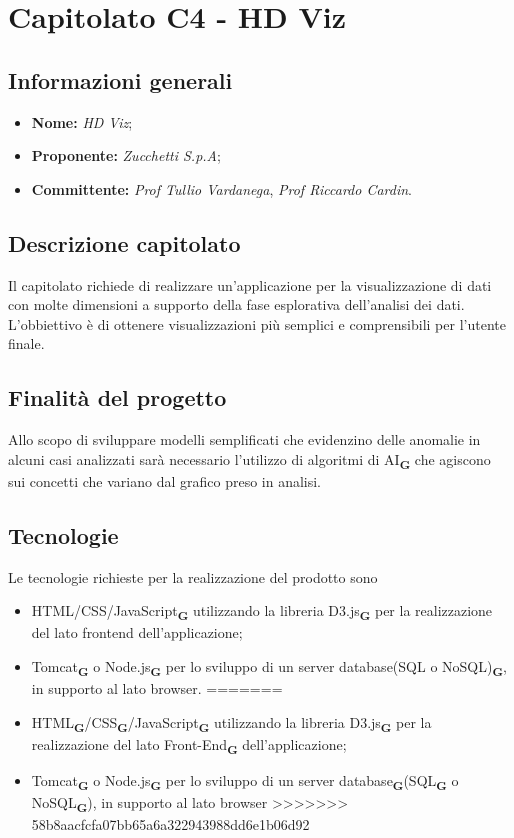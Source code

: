 \section{Capitolato C4 - HD Viz}

\subsection{Informazioni generali}

\begin{itemize}
    \item \textbf{Nome:} \textit{HD Viz};
    \item \textbf{Proponente:} \textit{Zucchetti S.p.A};
    \item \textbf{Committente:} \emph{Prof Tullio Vardanega}, \emph{Prof Riccardo Cardin}.
\end{itemize}

\subsection{Descrizione capitolato}
Il capitolato richiede di realizzare un'applicazione per la
visualizzazione di dati con molte dimensioni a supporto della fase esplorativa
dell'analisi dei dati. L'obbiettivo è di ottenere visualizzazioni più semplici e comprensibili per l'utente finale.

\subsection{Finalità del progetto}
Allo scopo di sviluppare modelli semplificati che evidenzino delle anomalie in alcuni casi analizzati sarà necessario l'utilizzo di algoritmi di AI\textsubscript{\textbf{G}} che agiscono sui concetti che variano dal grafico preso in analisi.

\subsection{Tecnologie}
Le tecnologie richieste per la realizzazione del prodotto sono
\begin{itemize}
<<<<<<< HEAD
    \item HTML/CSS/JavaScript\textsubscript{\textbf{G}} utilizzando la libreria D3.js\textsubscript{\textbf{G}} per la realizzazione del lato frontend dell'applicazione;
    \item Tomcat\textsubscript{\textbf{G}} o Node.js\textsubscript{\textbf{G}} per lo sviluppo di un server database(SQL o NoSQL)\textsubscript{\textbf{G}}, in supporto al lato browser.
=======
\item HTML\textsubscript{\textbf{G}}/CSS\textsubscript{\textbf{G}}/JavaScript\textsubscript{\textbf{G}} utilizzando la libreria D3.js\textsubscript{\textbf{G}} per la realizzazione del lato Front-End\textsubscript{\textbf{G}} dell'applicazione;
\item Tomcat\textsubscript{\textbf{G}} o Node.js\textsubscript{\textbf{G}} per lo sviluppo di un server database\textsubscript{\textbf{G}}(SQL\textsubscript{\textbf{G}} o NoSQL\textsubscript{\textbf{G}}), in supporto al lato browser
>>>>>>> 58b8aacfcfa07bb65a6a322943988dd6e1b06d92
\end{itemize}

